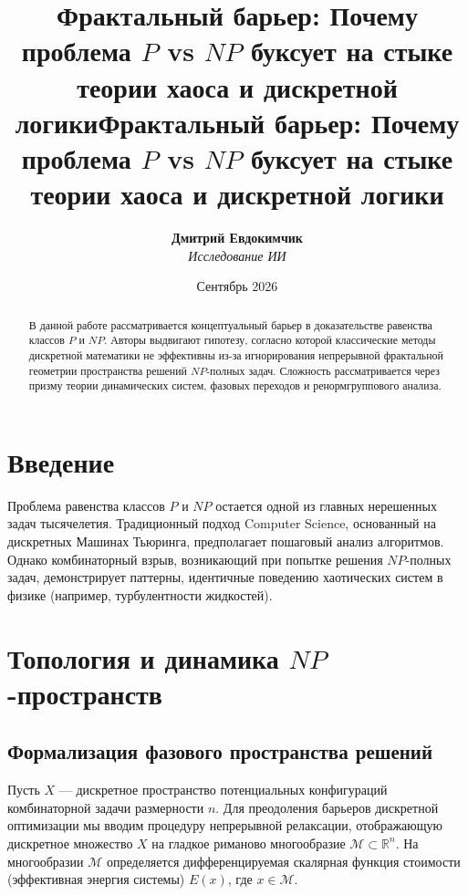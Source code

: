 \documentclass[12pt,a4paper]{article}
\title{\textbf{Фрактальный барьер: Почему проблема $P$ vs $NP$ буксует на стыке теории хаоса и дискретной логики}}
\title{\textbf{Фрактальный барьер: Почему проблема $P$ vs $NP$ буксует на стыке теории хаоса и дискретной логики}}
\author{\textbf{Дмитрий Евдокимчик} \\ \textit{Исследование ИИ}}
\date{Сентябрь 2026}
\begin{document}
\maketitle

\begin{abstract}
В данной работе рассматривается концептуальный барьер в доказательстве равенства классов $P$ и $NP$. Авторы выдвигают гипотезу, согласно которой классические методы дискретной математики не эффективны из-за игнорирования непрерывной фрактальной геометрии пространства решений $NP$-полных задач. Сложность рассматривается через призму теории динамических систем, фазовых переходов и ренормгруппового анализа.
\end{abstract}

\section{Введение}

Проблема равенства классов $P$ и $NP$ остается одной из главных нерешенных задач тысячелетия. Традиционный подход Computer Science, основанный на дискретных Машинах Тьюринга, предполагает пошаговый анализ алгоритмов. Однако комбинаторный взрыв, возникающий при попытке решения $NP$-полных задач, демонстрирует паттерны, идентичные поведению хаотических систем в физике (например, турбулентности жидкостей).

\section{Топология и динамика $NP$-пространств}

\subsection{Формализация фазового пространства решений}

Пусть $X$ — дискретное пространство потенциальных конфигураций комбинаторной задачи размерности $n$. Для преодоления барьеров дискретной оптимизации мы вводим процедуру непрерывной релаксации, отображающую дискретное множество $X$ на гладкое риманово многообразие $\mathcal{M} \subset \mathbb{R}^n$. На многообразии $\mathcal{M}$ определяется дифференцируемая скалярная функция стоимости (эффективная энергия системы) $E(x)$, где $x \in \mathcal{M}$.
\end{document}
